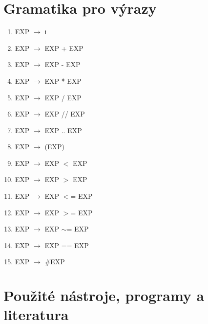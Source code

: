 \documentclass[12pt, letterpaper]{article}
\begin{document}
  
  

	\section{Gramatika pro výrazy}
	\begin{enumerate}
 \item EXP $\rightarrow$ i
 \item EXP $\rightarrow$ EXP + EXP
 \item EXP $\rightarrow$ EXP - EXP
 \item EXP $\rightarrow$ EXP * EXP
 \item EXP $\rightarrow$ EXP / EXP
 \item EXP $\rightarrow$ EXP // EXP
 \item EXP $\rightarrow$ EXP .. EXP
 \item EXP $\rightarrow$ (EXP)
 \item EXP $\rightarrow$ EXP $<$ EXP
 \item EXP $\rightarrow$ EXP $>$ EXP
 \item EXP $\rightarrow$ EXP $<$= EXP
 \item EXP $\rightarrow$ EXP $>$= EXP
 \item EXP $\rightarrow$ EXP $\sim$= EXP
 \item EXP $\rightarrow$ EXP == EXP
 \item EXP $\rightarrow$ $\#$EXP
 \end{enumerate}
 \newpage

	
 \newpage
 
	\section{Použité nástroje, programy a literatura}
\end{document}
